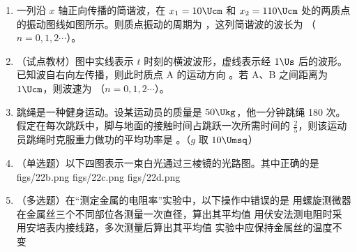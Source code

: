 \documentclass[\gkver]{gaokaozhenti}
\begin{document}
\begin{enumerate}
\item
一列沿 $x$ 轴正向传播的简谐波，在 $x_{1} = 10\Ucm$ 和 $x_{2} = 110\Ucm$ 处的两质点的振动图线如图所示。则质点振动的周期为 \tkanswer[1.6cm]{$4\Us$}，这列简谐波的波长为 （$n = 0,1,2\cdots$）。
\onepicture[align=right, w=6cm]{}

\item
（试点教材）图中实线表示 $t$ 时刻的横波波形，虚线表示经 $1\Us$ 后的波形。已知波自右向左传播，则此时质点 A 的运动方向 。若 A、B 之间距离为 $1\Ucm$，则波速为 （$n = 0,1,2\cdots$）。
\onepicture[align=right, w=6cm]{}

\item
跳绳是一种健身运动。设某运动员的质量是 $50\Ukg$，他一分钟跳绳 180 次。假定在每次跳跃中，脚与地面的接触时间占跳跃一次所需时间的 $\frac{2}{5}$，则该运动员跳绳时克服重力做功的平均功率是 \tkanswer[1.8cm]{$75\UW$}。（$g$ 取 $10\Umsq$）
\jdanswer{
$75\UW$
}

\item
（单选题）以下四图表示一束白光通过三棱镜的光路图。其中正确的是
{figs/22b.png}
{figs/22c.png}
{figs/22d.png}

\item
（多选题）在“测定金属的电阻率”实验中，以下操作中错误的是
{用螺旋测微器在金属丝三个不同部位各测量一次直径，算出其平均值}
{用伏安法测电阻时采用安培表内接线路，多次测量后算出其平均值}
{实验中应保持金属丝的温度不变}


\end{enumerate}
\end{document}
